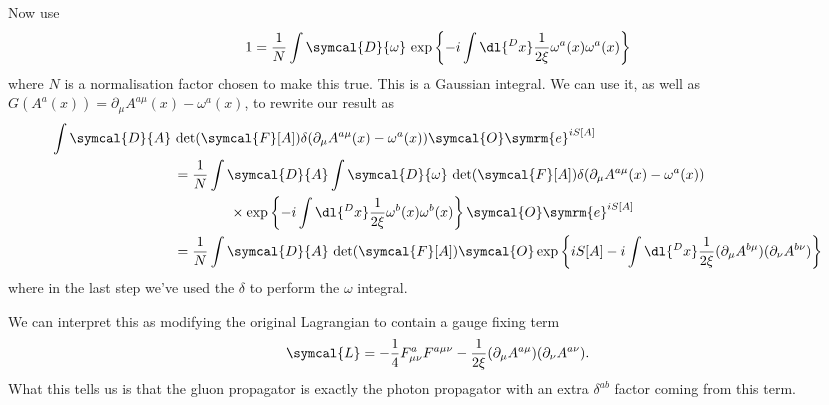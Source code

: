 \documentclass[fleqn]{NotesClass}
\newcommand{\e}{\symrm{e}}
\newcommand{\lagrangianDensity}{\symcal{L}}
\newcommand{\DL}[1]{\symcal{D}{#1}}
\begin{document}
    Now use
    \begin{equation}
        1 = \frac{1}{N} \int \DL{\omega} \, \exp\left\{ -i \int \dl{^Dx} \frac{1}{2\xi} \omega^a(x)\omega^a(x) \right\}
    \end{equation}
    where \(N\) is a normalisation factor chosen to make this true.
    This is a Gaussian integral.
    We can use it, as well as \(G(A^a(x)) = \partial_\mu A^{a\mu}(x) - \omega^a(x)\), to rewrite our result as
    \begin{align}
        \int \DL{A} \, &\det(\symcal{F}[A]) \delta(\partial_\mu A^{a\mu}(x) - \omega^a(x)) \symcal{O} \e^{iS[A]}\\
        &= \frac{1}{N} \int \DL{A} \int \DL{\omega} \, \det(\symcal{F}[A]) \delta(\partial_\mu A^{a\mu}(x) - \omega^a(x)) \notag\\
        &\qquad\qquad \times \exp\left\{ -i\int \dl{^Dx} \frac{1}{2\xi} \omega^b(x)\omega^b(x) \right\} \symcal{O} \e^{iS[A]}\\
        &= \frac{1}{N} \int \DL{A} \, \det(\symcal{F}[A]) \symcal{O} \exp\left\{ iS[A] - i\int \dl{^Dx} \frac{1}{2\xi} (\partial_\mu A^{b\mu})(\partial_\nu A^{b\nu}) \right\} \notag
    \end{align}
    where in the last step we've used the \(\delta\) to perform the \(\omega\) integral.
    
    We can interpret this as modifying the original Lagrangian to contain a gauge fixing term
    \begin{equation}
        \lagrangianDensity = -\frac{1}{4}F^a_{\mu\nu}F^{a\mu\nu} - \frac{1}{2\xi}(\partial_\mu A^{a\mu})(\partial_\nu A^{a\nu}).
    \end{equation}
    What this tells us is that the gluon propagator is exactly the photon propagator with an extra \(\delta^{ab}\) factor coming from this term.
    
\end{document}
